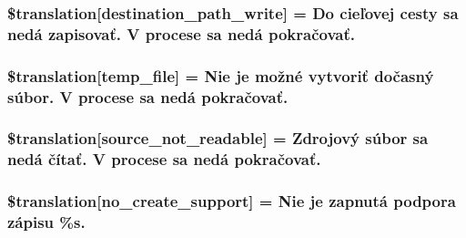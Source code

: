\subsubsection[{\$translation}]{\setlength{\rightskip}{0pt plus 5cm}\$translation\mbox{[}\textquotesingle{}destination\+\_\+path\+\_\+write\textquotesingle{}\mbox{]} = \textquotesingle{}Do cieľovej cesty sa nedá zapisovať. V procese sa nedá pokračovať.\textquotesingle{}}\label{class_8upload_8sk___s_k_8php_a40e4e1962226b89fd76da5819a9602b0}
\hypertarget{class_8upload_8sk___s_k_8php_a2baece8da11e20d45175db91851ec3e3}{}
\subsubsection[{\$translation}]{\setlength{\rightskip}{0pt plus 5cm}\$translation\mbox{[}\textquotesingle{}temp\+\_\+file\textquotesingle{}\mbox{]} = \textquotesingle{}Nie je možné vytvoriť dočasný súbor. V procese sa nedá pokračovať.\textquotesingle{}}\label{class_8upload_8sk___s_k_8php_a2baece8da11e20d45175db91851ec3e3}
\hypertarget{class_8upload_8sk___s_k_8php_a922967ca2df0efdd455261142d8e5715}{}
\subsubsection[{\$translation}]{\setlength{\rightskip}{0pt plus 5cm}\$translation\mbox{[}\textquotesingle{}source\+\_\+not\+\_\+readable\textquotesingle{}\mbox{]} = \textquotesingle{}Zdrojový súbor sa nedá čítať. V procese sa nedá pokračovať.\textquotesingle{}}\label{class_8upload_8sk___s_k_8php_a922967ca2df0efdd455261142d8e5715}
\hypertarget{class_8upload_8sk___s_k_8php_a346dfd1ade29f583dd20d345c436859f}{}
\subsubsection[{\$translation}]{\setlength{\rightskip}{0pt plus 5cm}\$translation\mbox{[}\textquotesingle{}no\+\_\+create\+\_\+support\textquotesingle{}\mbox{]} = \textquotesingle{}Nie je zapnutá podpora zápisu \%s.\textquotesingle{}}\label{class_8upload_8sk___s_k_8php_a346dfd1ade29f583dd20d345c436859f}
\hypertarget{class_8upload_8sk___s_k_8php_a53013ce9255c4e1849098ddd9fdb2b3f}{}
